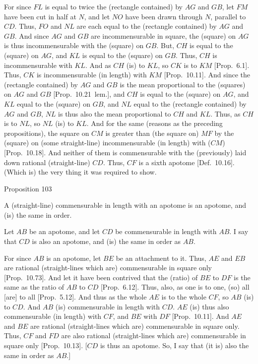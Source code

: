 For since $FL$ is equal to twice the (rectangle contained) by $AG$
and $GB$, let $FM$ have been cut in half at $N$, and let $NO$
have been drawn through $N$, parallel to $CD$. Thus, $FO$ and $NL$
are each equal to the (rectangle contained) by $AG$ and $GB$. And since
$AG$ and $GB$ are incommensurable in square, the (square) on $AG$
is thus incommensurable with the (square) on $GB$. But, $CH$ is equal to
the (square) on $AG$, and $KL$ is equal to the (square) on $GB$. 
Thus, $CH$ is incommensurable with $KL$. And as $CH$ (is) to
$KL$, so $CK$ is to $KM$ [Prop.~6.1].  Thus,
$CK$ is incommensurable (in length) with $KM$ [Prop.~10.11]. And since the (rectangle contained)
by $AG$ and $GB$ is the mean proportional to the (squares) on 
$AG$ and $GB$ [Prop.~10.21~lem.], and $CH$ is equal to the (square) on $AG$, and $KL$ 
equal to the (square) on $GB$, and $NL$ equal to the (rectangle contained)
by $AG$ and $GB$, $NL$ is thus also the mean proportional to
$CH$ and $KL$. Thus, as $CH$ is to $NL$, so $NL$ (is) to $KL$.
And for the same (reasons as the preceding propositions), the square on 
$CM$ is greater than (the square on) $MF$ by the (square) on (some
straight-line) incommensurable (in length) with ($CM$) [Prop.~10.18]. And neither
of them is commensurable with the (previously) laid down rational 
(straight-line) $CD$. Thus, $CF$ is a sixth apotome 
[Def.~10.16]. (Which is) the very thing it was required to show.


\begin{center}
{\large Proposition 103}
\end{center}

A (straight-line) commensurable in length
with an apotome is an apotome, and  (is) the same in order.

\epsfysize=0.7in
\centerline{}

Let $AB$ be an apotome, and let $CD$ be commensurable in length with $AB$. I say that $CD$ is also an apotome, and (is) the same in order as $AB$.

For since $AB$ is an apotome, let $BE$ be an attachment to it. Thus,
$AE$ and $EB$ are rational (straight-lines which are) commensurable in
square only [Prop.~10.73]. And let it have
been contrived that the (ratio)
of $BE$ to $DF$ is the same as the ratio of $AB$ to $CD$
[Prop.~6.12]. Thus, also, as one is to one, (so)
all [are] to all [Prop.~5.12]. And thus as the whole $AE$ is to the whole $CF$, so $AB$
(is) to $CD$. And $AB$ (is) commensurable in length with $CD$.
$AE$ (is) thus also commensurable (in length) with $CF$, and $BE$
with $DF$ [Prop.~10.11]. And $AE$ and $BE$
are rational (straight-lines which are) commensurable in square only.
Thus, $CF$ and $FD$ are also rational (straight-lines which are) commensurable in square only [Prop.~10.13].
[$CD$ is thus an apotome. So, I say that (it is) also the same in order as $AB$.]

